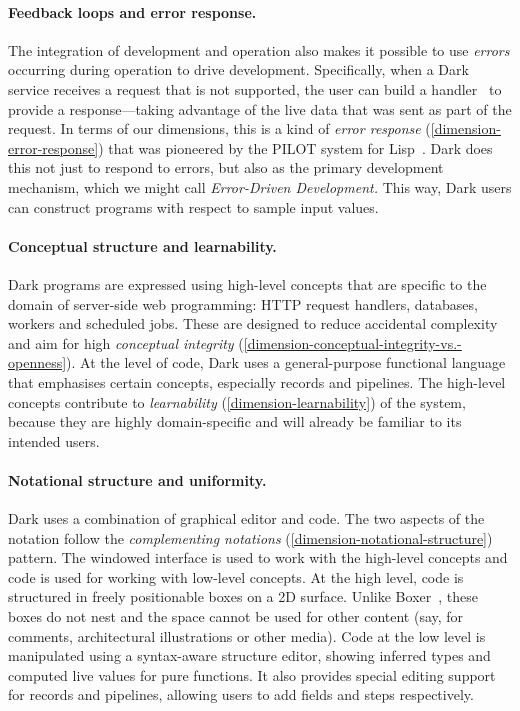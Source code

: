 \documentclass[ twoside,openright,titlepage,numbers=noenddot,headinclude,footinclude,cleardoublepage=empty,abstract=on,
                BCOR=5mm,paper=a4,fontsize=11pt
                ]{scrreprt}
\theoremstyle{definition}
\begin{document}
\paragraph{Feedback loops and error response.}

The integration of development and operation also makes it possible to
use \emph{errors} occurring during operation to drive development.
Specifically, when a Dark service receives a request that is not
supported, the user can build a handler~\parencite{DarkErrors} to
provide a response---taking advantage of the live data that was sent as
part of the request. In terms of our dimensions, this is a kind of
\emph{error response} (\ref{dimension-error-response}) that was
pioneered by the PILOT system for Lisp~\parencite{Pilot}. Dark does this
not just to respond to errors, but also as the primary development
mechanism, which we might call \emph{Error-Driven Development.} This
way, Dark users can construct programs with respect to sample input
values.

\paragraph{Conceptual structure and learnability.}

Dark programs are expressed using high-level concepts that are specific
to the domain of server-side web programming: HTTP request handlers,
databases, workers and scheduled jobs. These are designed to reduce
accidental complexity and aim for high \emph{conceptual integrity}
(\ref{dimension-conceptual-integrity-vs.-openness}). At the level of
code, Dark uses a general-purpose functional language that emphasises
certain concepts, especially records and pipelines. The high-level
concepts contribute to \emph{learnability}
(\ref{dimension-learnability}) of the system, because they are highly
domain-specific and will already be familiar to its intended users.

\paragraph{Notational structure and uniformity.}

Dark uses a combination of graphical editor and code. The two aspects of
the notation follow the \emph{complementing notations}
(\ref{dimension-notational-structure}) pattern. The windowed interface
is used to work with the high-level concepts and code is used for
working with low-level concepts. At the high level, code is structured
in freely positionable boxes on a 2D surface. Unlike
Boxer~\parencite{Boxer}, these boxes do not nest and the space cannot be
used for other content (say, for comments, architectural illustrations
or other media). Code at the low level is manipulated using a
syntax-aware structure editor, showing inferred types and computed live
values for pure functions. It also provides special editing support for
records and pipelines, allowing users to add fields and steps
respectively.
\end{document}
